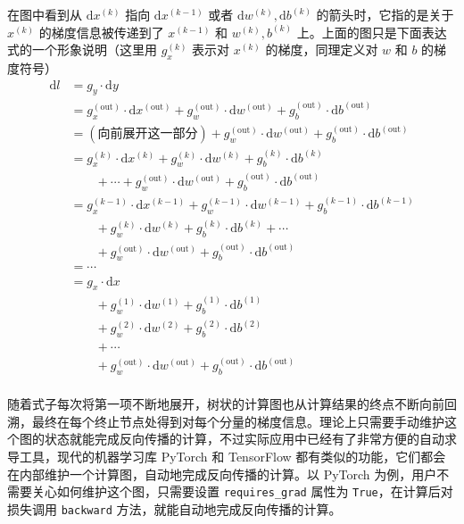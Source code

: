 在图中看到从 $\mathrm{d}x^{(k)}$ 指向 $\mathrm{d}x^{(k-1)}$ 或者 $\mathrm{d}w^{(k)}, \mathrm{d}b^{(k)}$ 的箭头时，它指的是关于 $x^{(k)}$ 的梯度信息被传递到了 $x^{(k-1)}$ 和 $w^{(k)}, b^{(k)}$ 上。上面的图只是下面表达式的一个形象说明（这里用 $g_x^{(k)}$ 表示对 $x^{(k)}$ 的梯度，同理定义对 $w$ 和 $b$ 的梯度符号）
\[
\begin{aligned}
    \mathrm{d}l &= g_y \cdot \mathrm{d}y \\
    &= g_x^{(\text{out})} \cdot \mathrm{d}x^{(\text{out})} + g_w^{(\text{out})} \cdot \mathrm{d}w^{(\text{out})} + g_b^{(\text{out})} \cdot \mathrm{d}b^{(\text{out})} \\
    &= (\text{向前展开这一部分}) + g_w^{(\text{out})} \cdot \mathrm{d}w^{(\text{out})} + g_b^{(\text{out})} \cdot \mathrm{d}b^{(\text{out})} \\
    &= g_x^{(k)} \cdot \mathrm{d}x^{(k)} + g_w^{(k)} \cdot \mathrm{d}w^{(k)} + g_b^{(k)} \cdot \mathrm{d}b^{(k)} \\
    & \qquad+ \cdots + g_w^{(\text{out})} \cdot \mathrm{d}w^{(\text{out})} + g_b^{(\text{out})} \cdot \mathrm{d}b^{(\text{out})}\\
    &= g_x^{(k-1)} \cdot \mathrm{d}x^{(k-1)} + g_w^{(k-1)} \cdot \mathrm{d}w^{(k-1)} + g_b^{(k-1)} \cdot \mathrm{d}b^{(k-1)} \\
    & \qquad+ g_w^{(k)} \cdot \mathrm{d}w^{(k)} + g_b^{(k)} \cdot \mathrm{d}b^{(k)} + \cdots \\
    &\qquad + g_w^{(\text{out})} \cdot \mathrm{d}w^{(\text{out})} + g_b^{(\text{out})} \cdot \mathrm{d}b^{(\text{out})}\\
    & = \cdots \\
    & = g_x \cdot \mathrm{d}x \\
    & \qquad + g_w^{(1)} \cdot \mathrm{d}w^{(1)} + g_b^{(1)} \cdot \mathrm{d}b^{(1)} \\
    & \qquad + g_w^{(2)} \cdot \mathrm{d}w^{(2)} + g_b^{(2)} \cdot \mathrm{d}b^{(2)} \\
    & \qquad + \cdots \\
    & \qquad + g_w^{(\text{out})} \cdot \mathrm{d}w^{(\text{out})} + g_b^{(\text{out})} \cdot \mathrm{d}b^{(\text{out})}\\
\end{aligned}
\]

随着式子每次将第一项不断地展开，树状的计算图也从计算结果的终点不断向前回溯，最终在每个终止节点处得到对每个分量的梯度信息。理论上只需要手动维护这个图的状态就能完成反向传播的计算，不过实际应用中已经有了非常方便的自动求导工具，现代的机器学习库 PyTorch 和 TensorFlow 都有类似的功能，它们都会在内部维护一个计算图，自动地完成反向传播的计算。以 PyTorch 为例，用户不需要关心如何维护这个图，只需要设置 \texttt{requires\_grad} 属性为 \texttt{True}，在计算后对损失调用 \texttt{backward} 方法，就能自动地完成反向传播的计算。

